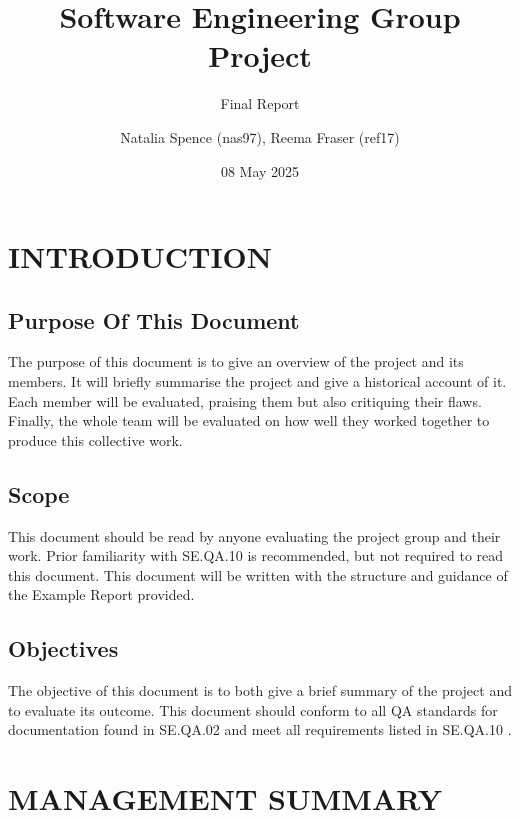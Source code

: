 \documentclass[a4paper]{project}
\title{Software Engineering Group Project}
\subtitle{Final Report}
\date{08 May 2025}
\author{
	Natalia Spence (nas97),
	Reema Fraser (ref17)
}
\begin{document}
	\maketitle
	\tableofcontents
	
	\newpage
	
	\section{INTRODUCTION}\label{sec:introduction}
	
		\subsection{Purpose Of This Document}\label{subsec:document-purpose}
	
			The purpose of this document is to give an overview of the project and its members. It will briefly summarise the project and give a historical account of it. Each member will be evaluated, praising them but also critiquing their flaws. Finally, the whole team will be evaluated on how well they worked together to produce this collective work.
		
		\subsection{Scope}\label{subsec:document-scope}
			
			This document should be read by anyone evaluating the project group and their work. Prior familiarity with SE.QA.10 \cite{SE.QA.10} is recommended, but not required to read this document. This document will be written with the structure and guidance of the Example Report \cite{Example Report} provided.
			
		\subsection{Objectives}\label{subsec:document-objectives}
			
			The objective of this document is to both give a brief summary of the project and to evaluate its outcome. This document should conform to all QA standards for documentation found in SE.QA.02 \cite{SE.QA.02} and meet all requirements listed in SE.QA.10 \cite{SE.QA.10}.
	
	\section{MANAGEMENT SUMMARY}\label{sec:management-summary}
	
\end{document}
